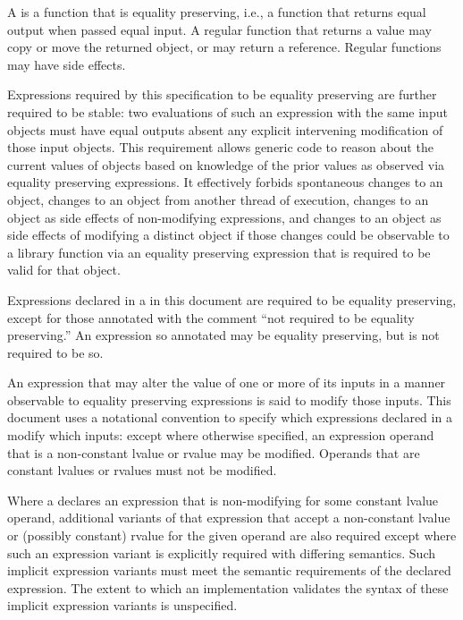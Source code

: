 \begin{addedblock}
\pnum
A  is a function that is equality preserving,
i.e., a function that returns equal output when passed equal input. A regular
function that returns a value may copy or move the returned object, or may return a
reference. \enternote Regular functions may have side effects. \exitnote

\pnum
Expressions required by this specification to be equality preserving are
further required to be stable: two evaluations of such an expression with the same
input objects must have equal outputs absent any
explicit intervening modification of those input objects.
\enternote This requirement allows generic code to reason
about the current values of objects based on knowledge of the prior values as
observed via equality preserving expressions. It effectively forbids spontaneous
changes to an object, changes to an object from another thread of execution, changes
to an object as side effects of non-modifying expressions, and changes to an object as
side effects of modifying a distinct object if those changes could be observable
to a library function via an equality preserving expression that is required to be
valid for that object. \exitnote

\pnum
Expressions declared in a  in this document are
required to be equality preserving, except for those annotated with the comment
``not required to be equality preserving.'' An expression so annotated
may be equality preserving, but is not required to be so.

\pnum
An expression that may alter the value of one or more of its inputs in a manner
observable to equality preserving expressions is said to modify those inputs.
This document uses a notational convention to specify which expressions declared
in a  modify which inputs: except where otherwise
specified, an expression operand that is a non-constant lvalue or rvalue may be
modified. Operands that are constant lvalues or rvalues must not be modified.

\pnum
Where a  declares an expression that is non-modifying
for some constant lvalue operand, additional variants of that expression that accept
a non-constant lvalue or (possibly constant) rvalue for the given operand are also
required except where such an expression variant is explicitly required with
differing semantics. Such implicit expression variants must meet the semantic
requirements of the declared expression. The extent to which an implementation
validates the syntax of these implicit expression variants is unspecified.


\end{addedblock}
